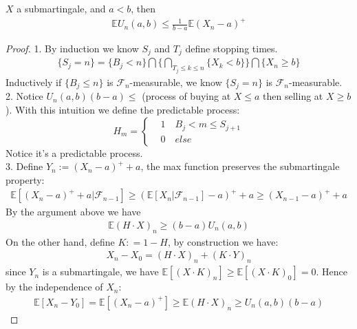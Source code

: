 \begin{theorem}
	$X$ a submartingale, and $a < b$, then 
	\begin{align*}
		\mathbb{E}U_n(a, b) \leq  \frac{1}{b-a} \mathbb{E}(X_n - a)^+
	\end{align*}
\end{theorem}
\begin{proof}
1. By induction we know $S_j$ and $T_j$ define stopping times.
	\begin{align*}
		\{S_j = n\} = \{B_j < n\} \bigcap \bigg\{ \bigcap_{T_j \leq k \leq n}  \{ X_k < b\} \bigg\} \bigcap \{X_n \geq b\}
	\end{align*}
	Inductively if $\{B_j \leq n\}$ is $\mathcal{F}_{n}$-measurable, we know $\{S_j = n\}$ is $\mathcal{F}_n$-measurable.\\
2. Notice $U_n(a, b) (b - a) \leq$ (process of buying at $X \leq a$ then selling at $X \geq b$). With this intuition we define the predictable process:
\begin{equation*}
H_m =  \left\{
\begin{aligned}
	&1 \quad B_j < m \leq S_{j+1}\\
	&0 \quad else
\end{aligned}
\right.
\end{equation*} 
Notice it's a predictable process.\\  
3. Define $Y_n := (X_n - a)^+ + a$, the max function preserves the submartingale property:
	\begin{align*}
		\mathbb{E}[(X_n - a)^+ + a | \mathcal{F}_{n-1}] \geq (\mathbb{E}[X_n|\mathcal{F}_{n-1}] - a)^+ + a
		\geq (X_{n-1} - a)^+ + a
	\end{align*}
	By the argument above we have
	\begin{align*}
		\mathbb{E}(H \cdot X)_n \geq (b-a) U_n(a,b)
	\end{align*}
	On the other hand, define $K: = 1 - H$,  by construction we have:
	\begin{align*}
		X_n - X_0  = (H\cdot X)_n + (K\cdot Y)_n
	\end{align*}
	since $Y_n$ is a submartingale, we have $\mathbb{E}[(X\cdot K)_n] \geq \mathbb{E}[(X\cdot K)_0]  = 0$. Hence by the independence of $X_n$:
	\begin{align*}
		\mathbb{E}[X_n - Y_0] = \mathbb{E}[(X_n - a)^+] \geq \mathbb{E}(H\cdot X)_n \geq U_n(a, b)(b - a)
	\end{align*} 
\end{proof}


